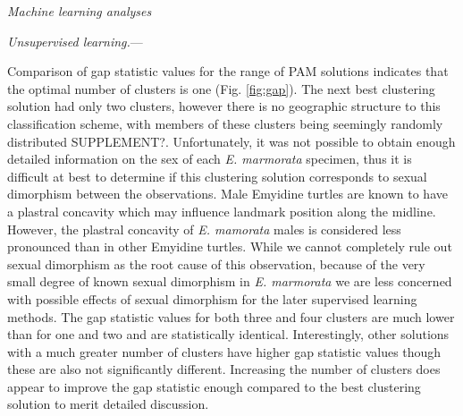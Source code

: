 \documentclass[12pt,letterpaper]{article}\usepackage{graphicx, color}
\renewcommand{\subsection}[1]{%
\bigskip
\begin{center}
\begin{large}
\normalfont\itshape #1
\end{large}
\end{center}}
\renewcommand{\subsubsection}[1]{%
\vspace{2ex}
\noindent
\textit{#1.}---}
\begin{document}
\subsection{Machine learning analyses}
\subsubsection{Unsupervised learning}

Comparison of gap statistic values for the range of PAM solutions indicates that the optimal number of clusters is one (Fig. \ref{fig:gap}). The next best clustering solution had only two clusters, however there is no geographic structure to this classification scheme, with members of these clusters being seemingly randomly distributed SUPPLEMENT?. Unfortunately, it was not possible to obtain enough detailed information on the sex of each \textit{E. marmorata} specimen, thus it is difficult at best to determine if this clustering solution corresponds to sexual dimorphism between the observations. Male Emyidine turtles are known to have a plastral concavity which may influence landmark position along the midline. However, the plastral concavity of \textit{E. mamorata} males is considered less pronounced than in other Emyidine turtles. While we cannot completely rule out sexual dimorphism as the root cause of this observation, because of the very small degree of known sexual dimorphism in \textit{E. marmorata} we are less concerned with possible effects of sexual dimorphism for the later supervised learning methods. 
The gap statistic values for both three and four clusters are much lower than for one and two and are statistically identical. Interestingly, other solutions with a much greater number of clusters have higher gap statistic values though these are also not significantly different. Increasing the number of clusters does appear to improve the gap statistic enough compared to the best clustering solution to merit detailed discussion.
\end{document}
